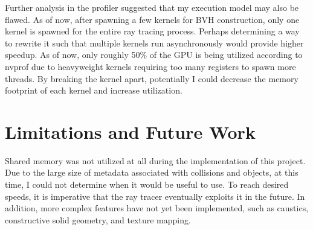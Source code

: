\documentclass[11pt]{article}
\begin{document}
Further analysis in the profiler suggested that my execution model may also be flawed. As of now, after spawning a few kernels for BVH construction, only one kernel
is spawned for the entire ray tracing process. Perhaps determining a way to rewrite it such that multiple kernels run asynchronously would provide higher speedup.
As of now, only roughly 50\% of the GPU is being utilized according to nvprof due to heavyweight kernels requiring too many registers to spawn more threads. By breaking
the kernel apart, potentially I could decrease the memory footprint of each kernel and increase utilization.

\section{Limitations and Future Work}
Shared memory was not utilized at all during the implementation of this project. Due to the large size of metadata associated with collisions
and objects, at this time, I could not determine when it would be useful to use. To reach desired speeds, it is imperative that the ray tracer
eventually exploits it in the future. In addition, more complex features have not yet been implemented, such as caustics, constructive solid geometry,
and texture mapping.
\end{document}
